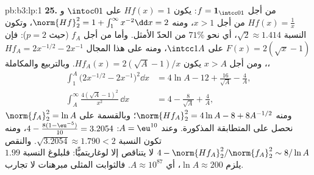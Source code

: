 \begin{solution}{pb:b3:lp:1}
\textbf{25.} من أجل $f = \mathbf 1_{\intcc01}$: يكون $Hf(x) = 1$ على $\intoc01$
و $Hf(x) = \frac1x$ من أجل $x > 1$، ومنه $\norm{Hf}_2^2 = 1 + \int_1^\infty x^{-2}\dd x = 2$، وتكون النسبة $\sqrt2 \approx 1.414$،
أي نحو $71\%$ من الحدّ الأمثل. وأما من أجل $f_A$ (حيث $p = 2$):
فإن $F(x) = 2(\sqrt x - 1)$ على $\intcc1A$، ومنه على هذا المجال $Hf_A = 2x^{-1/2} - 2x^{-1}$، ومن
أجل $x > A$ يكون $Hf_A(x) = 2(\sqrt A - 1)/x$. وبالتربيع والمكاملة،
\begin{align*}
\int_1^A\bigl(2x^{-1/2} - 2x^{-1}\bigr)^2\dd x
&= 4\ln A - 12 + \frac{16}{\sqrt A} - \frac4A,\\
\int_A^{\infty}\frac{4(\sqrt A - 1)^2}{x^2}\,\dd x
&= 4 - \frac{8}{\sqrt A} + \frac4A,
\end{align*}
ومنه $\norm{Hf_A}_2^2 = 4\ln A - 8 + 8A^{-1/2}$؛ وبالقسمة على $\norm{f_A}_2^2 = \ln A$ نحصل على المتطابقة
المذكورة. وعند $A
= \eu^{10}$: $4 - \frac{8(1 - \eu^{-5})}{10} = 3.2054$، ومنه تكون النسبة $\sqrt{3.2054} \approx 1.790 < 2$.
والنقص $4 - \norm{Hf_A}_2^2/\norm{f_A}_2^2 \sim 8/\ln A$ لا يتناقص إلا لوغاريتميًّا: فلبلوغ النسبة $1.99$
يلزم $\ln A \approx 200$، أي $A \approx 10^{87}$. فالثوابت المثلى مبرهنات لا تجارب.
\end{solution}
